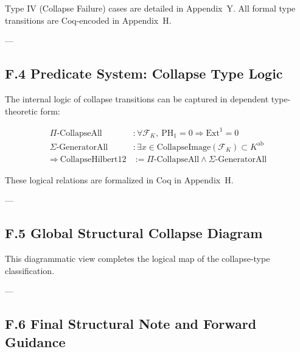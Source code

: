\documentclass[11pt]{article}
\begin{document}
Type IV (Collapse Failure) cases are detailed in Appendix~Y.  
All formal type transitions are Coq-encoded in Appendix~H.

---

\subsection*{F.4 Predicate System: Collapse Type Logic}

The internal logic of collapse transitions can be captured in dependent type-theoretic form:

\begin{align*}
\Pi\text{-CollapseAll} &\colon \forall \mathcal{F}_K,\ \mathrm{PH}_1 = 0 \Rightarrow \mathrm{Ext}^1 = 0 \\
\Sigma\text{-GeneratorAll} &\colon \exists x \in \text{CollapseImage}(\mathcal{F}_K) \subset K^{\mathrm{ab}} \\
\Rightarrow\ \text{CollapseHilbert12} &:= \Pi\text{-CollapseAll} \wedge \Sigma\text{-GeneratorAll}
\end{align*}

These logical relations are formalized in Coq in Appendix~H.

---

\subsection*{F.5 Global Structural Collapse Diagram}

\begin{center}
\end{center}

This diagrammatic view completes the logical map of the collapse-type classification.

---

\subsection*{F.6 Final Structural Note and Forward Guidance}
\end{document}
